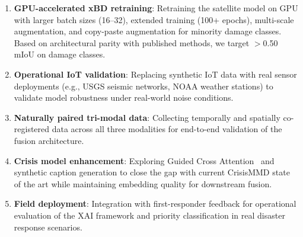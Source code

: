 \documentclass[journal]{IEEEtran}
\begin{document}
\begin{enumerate}
    \item \textbf{GPU-accelerated xBD retraining}: Retraining the satellite model on GPU with larger batch sizes (16--32), extended training (100+ epochs), multi-scale augmentation, and copy-paste augmentation for minority damage classes. Based on architectural parity with published methods, we target $>$0.50 mIoU on damage classes.
    \item \textbf{Operational IoT validation}: Replacing synthetic IoT data with real sensor deployments (e.g., USGS seismic networks, NOAA weather stations) to validate model robustness under real-world noise conditions.
    \item \textbf{Naturally paired tri-modal data}: Collecting temporally and spatially co-registered data across all three modalities for end-to-end validation of the fusion architecture.
    \item \textbf{Crisis model enhancement}: Exploring Guided Cross Attention~\cite{mouzannar2025guidedcross} and synthetic caption generation to close the gap with current CrisisMMD state of the art while maintaining embedding quality for downstream fusion.
    \item \textbf{Field deployment}: Integration with first-responder feedback for operational evaluation of the XAI framework and priority classification in real disaster response scenarios.
\end{enumerate}
\end{document}
